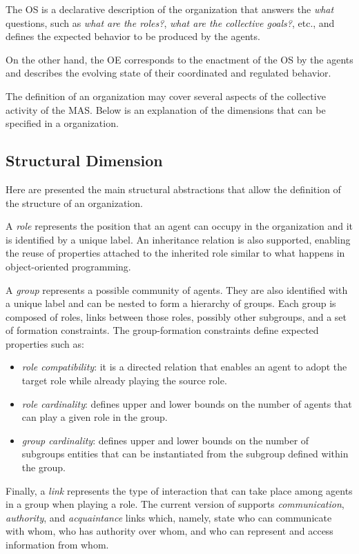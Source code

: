 The OS is a declarative description of the organization that answers the \textit{what} questions, such as \textit{what are the roles?}, \textit{what are the collective goals?}, etc., and defines the expected behavior to be produced by the agents.

On the other hand, the OE corresponds to the enactment of the OS by the agents and describes the evolving state of their coordinated and regulated behavior.

The definition of an organization may cover several aspects of the collective activity of the MAS.
Below is an explanation of the dimensions that can be specified in a \moise{} organization.

\subsection{Structural Dimension}
Here are presented the main structural abstractions that allow the definition of the structure of an organization.

A \textit{role} represents the position that an agent can occupy in the organization and it is identified by a unique label.
An inheritance relation is also supported, enabling the reuse of properties attached to the inherited role similar to what happens in object-oriented programming.

A \textit{group} represents a possible community of agents.
They are also identified with a unique label and can be nested to form a hierarchy of groups.
Each group is composed of roles, links between those roles, possibly other subgroups, and a set of formation constraints.
The group-formation constraints define expected properties such as:
\begin{itemize}
    \item \textit{role compatibility}: it is a directed relation that enables an agent to adopt the target role while already playing the source role.
    \item \textit{role cardinality}: defines upper and lower bounds on the number of agents that can play a given role in the group.
    \item \textit{group cardinality}: defines upper and lower bounds on the number of subgroups entities that can be instantiated from the subgroup defined within the group.
\end{itemize}

Finally, a \textit{link} represents the type of interaction that can take place among agents in a group when playing a role.
The current version of \moise{} supports \textit{communication}, \textit{authority}, and \textit{acquaintance} links which, namely, state who can communicate with whom, who has authority over whom, and who can represent and access information from whom.

